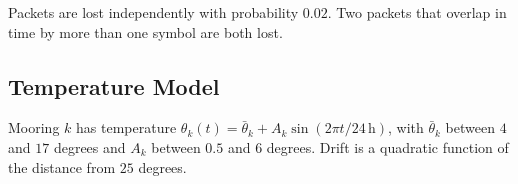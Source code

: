 \documentclass[conference]{IEEEtran}
\begin{document}
Packets are lost independently with probability $0.02$. Two packets that
overlap in time by more than one symbol are both lost.

\subsection{Temperature Model}
\label{app:params-temp}

Mooring $k$ has temperature
$\theta_k(t) = \bar{\theta}_k + A_k \sin(2 \pi t / 24\,\mathrm{h})$,
with $\bar{\theta}_k$ between $4$ and $17$ degrees and $A_k$ between $0.5$ and
$6$ degrees. Drift is a quadratic function of the distance from $25$ degrees.



\end{document}
